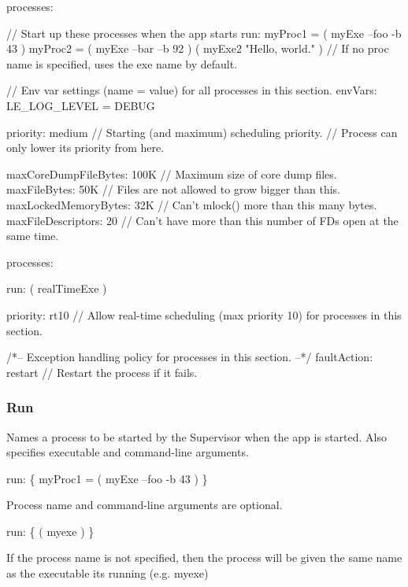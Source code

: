 \begin{DoxyVerb}processes:
{
    // Start up these processes when the app starts
    run:
    {
        myProc1 = ( myExe --foo -b 43 )
        myProc2 = ( myExe –bar --b 92 )
        ( myExe2 "Hello, world." )  // If no proc name is specified, uses the exe name by default.
    }

    // Env var settings (name = value) for all processes in this section.
    envVars:
    {
        LE_LOG_LEVEL = DEBUG
    }

    priority: medium    // Starting (and maximum) scheduling priority.
                        // Process can only lower its priority from here.

    maxCoreDumpFileBytes: 100K  // Maximum size of core dump files.
    maxFileBytes: 50K           // Files are not allowed to grow bigger than this.
    maxLockedMemoryBytes: 32K   // Can't mlock() more than this many bytes.
    maxFileDescriptors: 20      // Can't have more than this number of FDs open at the same time.
}

processes:
{
    run:
    {
        ( realTimeExe )
    }

    priority: rt10   // Allow real-time scheduling (max priority 10) for processes in this section.

    /*-- Exception handling policy for processes in this section. --*/
    faultAction: restart   // Restart the process if it fails.
}
\end{DoxyVerb}
\hypertarget{def_files_adef_defFilesAdef_processRun}{}\subsubsection{Run}\label{def_files_adef_defFilesAdef_processRun}
Names a process to be started by the Supervisor when the app is started. Also specifies executable and command-\/line arguments.


\begin{DoxyCode}
run:
\{
    myProc1 = ( myExe --foo -b 43 )
\}
\end{DoxyCode}


Process name and command-\/line arguments are optional.


\begin{DoxyCode}
run:
\{
    ( myexe )
\}
\end{DoxyCode}


If the process name is not specified, then the process will be given the same name as the executable it\textquotesingle{}s running (e.\+g. {\ttfamily myexe})


